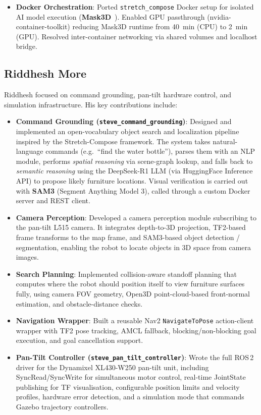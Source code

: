 \documentclass[12pt,oneside,a4paper]{article}
\begin{document}
\begin{itemize}
    \item \textbf{Docker Orchestration}: Ported \texttt{stretch\_compose} Docker setup for isolated AI model execution (\textbf{Mask3D}~\cite{schult2023mask3d}). Enabled GPU passthrough (nvidia-container-toolkit) reducing Mask3D runtime from 40~min (CPU) to 2~min (GPU). Resolved inter-container networking via shared volumes and localhost bridge.
\end{itemize}

\subsection{Riddhesh More}
Riddhesh focused on command grounding, pan-tilt hardware control, and simulation infrastructure. His key contributions include:
\begin{itemize}
    \item \textbf{Command Grounding (\texttt{steve\_command\_grounding})}: Designed and implemented an open-vocabulary object search and localization pipeline inspired by the Stretch-Compose framework. The system takes natural-language commands (e.g.\ ``find the water bottle''), parses them with an NLP module, performs \emph{spatial reasoning} via scene-graph lookup, and falls back to \emph{semantic reasoning} using the DeepSeek-R1 LLM\cite{deepseek2025r1} (via HuggingFace Inference API) to propose likely furniture locations. Visual verification is carried out with \textbf{SAM3} (Segment Anything Model 3)\cite{carion2025sam3}, called through a custom Docker server and REST client.
    \item \textbf{Camera Perception}: Developed a camera perception module subscribing to the pan-tilt L515 camera. It integrates depth-to-3D projection, TF2-based frame transforms to the map frame, and SAM3-based object detection / segmentation, enabling the robot to locate objects in 3D space from camera images.
    \item \textbf{Search Planning}: Implemented collision-aware standoff planning that computes where the robot should position itself to view furniture surfaces fully, using camera FOV geometry, Open3D point-cloud-based front-normal estimation, and obstacle-distance checks.
    \item \textbf{Navigation Wrapper}: Built a reusable Nav2 \texttt{NavigateToPose} action-client wrapper with TF2 pose tracking, AMCL fallback, blocking/non-blocking goal execution, and goal cancellation support.
    \item \textbf{Pan-Tilt Controller (\texttt{steve\_pan\_tilt\_controller})}: Wrote the full ROS\,2 driver for the Dynamixel XL430-W250 pan-tilt unit, including SyncRead/SyncWrite for simultaneous motor control, real-time JointState publishing for TF visualisation, configurable position limits and velocity profiles, hardware error detection, and a simulation mode that commands Gazebo trajectory controllers.


\end{itemize}
\end{document}

